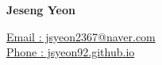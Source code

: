 \documentclass[letterpaper,11pt,oneside]{article}
\begin{document}
\begin{center}
\noindent  \LARGE{\textbf{Jeseng Yeon}}
\end{center}

\normalsize



\vspace{-3ex}
\null\hfill \href{mailto:jsyeon2367@naver.com}{Email : jsyeon2367@naver.com} \\
\null\hfill  \href{jsyeon92.github.io}{Phone : jsyeon92.github.io}   \\
\vspace{-2ex}


\vspace{1em}

\end{document}
